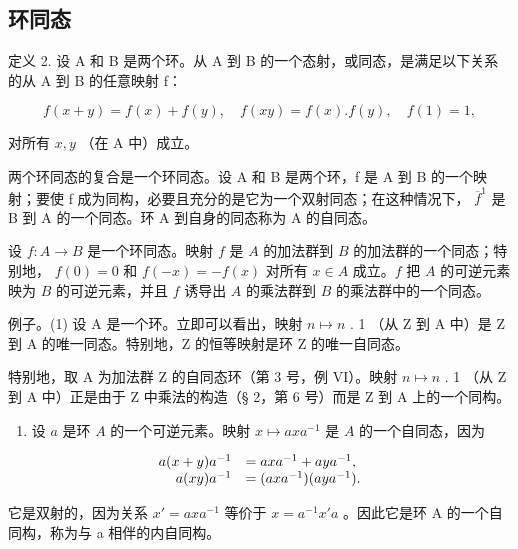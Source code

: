 \subsection{环同态}

定义 2. 设 A 和 B 是两个环。从 A 到 B 的一个态射，或同态，是满足以下关系的从 A 到 B 的任意映射 f：

\[
f (x + y) = f (x) + f (y), \quad f (x y) = f (x). f (y), \quad f (1) = 1,\tag{17}
\]

对所有 \(x, y\) （在 A 中）成立。

两个环同态的复合是一个环同态。设 A 和 B 是两个环，f 是 A 到 B 的一个映射；要使 f 成为同构，必要且充分的是它为一个双射同态；在这种情况下， \(\overline{f}^{1}\) 是 B 到 A 的一个同态。环 A 到自身的同态称为 A 的自同态。

设 \(f: A \to B\) 是一个环同态。映射 \(f\) 是 \(A\) 的加法群到 \(B\) 的加法群的一个同态；特别地， \(f(0) = 0\) 和 \(f(-x) = -f(x)\) 对所有 \(x \in A\) 成立。\(f\) 把 \(A\) 的可逆元素映为 \(B\) 的可逆元素，并且 \(f\) 诱导出 \(A\) 的乘法群到 \(B\) 的乘法群中的一个同态。

例子。(1) 设 A 是一个环。立即可以看出，映射 \(n \mapsto n\) . 1 （从 Z 到 A 中）是 Z 到 A 的唯一同态。特别地，Z 的恒等映射是环 Z 的唯一自同态。

特别地，取 A 为加法群 Z 的自同态环（第 3 号，例 VI）。映射 \(n \mapsto n\) . 1 （从 Z 到 A 中）正是由于 Z 中乘法的构造（§ 2，第 6 号）而是 Z 到 A 上的一个同构。

\begin{enumerate}
\def\labelenumi{(\arabic{enumi})}
\setcounter{enumi}{1}
\tightlist
\item
  设 \(a\) 是环 \(A\) 的一个可逆元素。映射 \(x \mapsto axa^{-1}\) 是 \(A\) 的一个自同态，因为
\end{enumerate}

\[
\begin{array}{r l} a (x + y) a ^ {- 1} & = a x a ^ {- 1} + a y a ^ {- 1}, \\ a (x y) a ^ {- 1} & = (a x a ^ {- 1}) (a y a ^ {- 1}). \end{array}
\]

它是双射的，因为关系 \(x' = axa^{-1}\) 等价于 \(x = a^{-1}x'a\) 。因此它是环 A 的一个自同构，称为与 a 相伴的内自同构。

